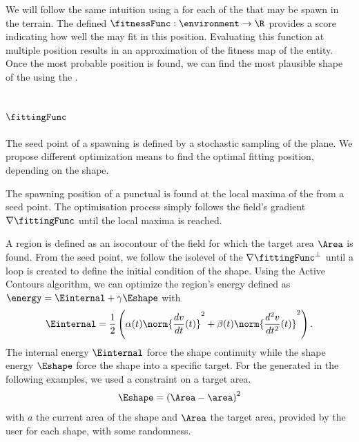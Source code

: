 We will follow the same intuition using a  for each of the  that may be spawn in the terrain. The  defined $\fitnessFunc: \environment \to \R$ provides a score indicating how well the  may fit in this position. Evaluating this function at multiple position results in an approximation of the fitness map of the entity. Once the most probable position is found, we can find the most plausible shape of the  using the .


\subsection{ $\fittingFunc$}
The seed point of a spawning  is defined by a stochastic sampling of the plane. We propose different optimization means to find the optimal fitting position, depending on the  shape.

The spawning position of a punctual  is found at the local maxima of the  from a seed point. The optimisation process simply follows the field's gradient $\nabla \fittingFunc$ until the local maxima is reached.

A region is defined as an isocontour of the field for which the target area $\Area$ is found. From the seed point, we follow the isolevel of the  $\nabla \fittingFunc^\perp$ until a loop is created to define the initial condition of the shape. Using the Active Contours algorithm, we can optimize the region's energy defined as $\energy = \Einternal + \gamma \Eshape$ with  
\begin{align}
    \label{eq:internal-energy-equation}
    \Einternal = \frac{1}{2} \left( \alpha(t) \norm{\frac{d v}{d t}(t)}^2 + \beta(t) \norm{\frac{d^2 v}{d t^2}(t)}^2  \right).
\end{align}
The internal energy $\Einternal$ force the shape continuity while the shape energy $\Eshape$ force the shape into a specific target. For the  generated in the following examples, we used a constraint on a target area.
\begin{align}
    \label{eq:area-target-equation}
    \Eshape = \left( \Area - \area \right)^2
\end{align}
with $a$ the current area of the shape and $\Area$ the target area, provided by the user for each shape, with some randomness.

